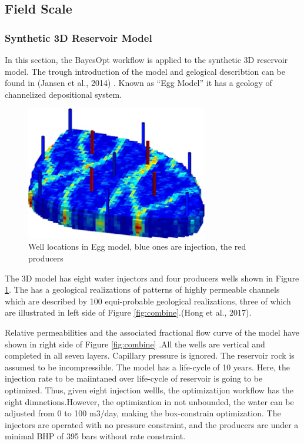 \documentclass[]{elsarticle} %
\begin{document}
\newpage

\hypertarget{field-scale}{%
\subsection{Field Scale}\label{field-scale}}

\hypertarget{synthetic-3d-reservoir-model}{%
\subsubsection{Synthetic 3D Reservoir Model}\label{synthetic-3d-reservoir-model}}

In this section, the BayesOpt workflow is applied to the synthetic 3D reservoir model. The trough introduction of the model and gelogical describtion can be found in (Jansen et al., 2014) . Known as ``Egg Model'' it has a geology of channelized depositional system.

\begin{figure}

{\centering \includegraphics[width=300px]{img/egg_base} 

}

\caption{Well locations in Egg model, blue ones are injection, the red producers}\label{fig:eggbase}
\end{figure}

The 3D model has eight water injectors and four producers wells shown in Figure \ref{fig:eggbase}. The has a geological realizations of patterns of highly permeable channels which are described by 100 equi-probable geological realizations, three of which are illustrated in left side of Figure \ref{fig:combine}.(Hong et al., 2017).

Relative permeabilities and the associated fractional flow curve of the model have shown in right side of Figure \ref{fig:combine} .All the wells are vertical and completed in all seven layers. Capillary pressure is ignored. The reservoir rock is assumed to be incompressible. The model has a life-cycle of 10 years. Here, the injection rate to be maiintaned over life-cycle of reservoir is going to be optimized. Thus, given eight injection wellls, the optimizatijon workflow has the eight dimnetions.However, the optimization in not unbounded, the water can be adjusted from 0 to 100 m3/day, making the box-constrain optimization. The injectors are operated with no pressure constraint, and the producers are under a minimal BHP of 395 bars without rate constraint.
\end{document}
